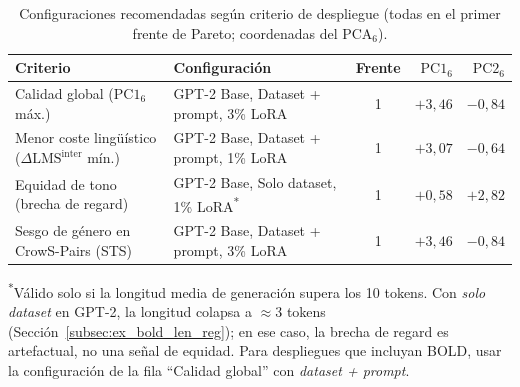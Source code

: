 \documentclass[12pt,a4paper]{report}
\newcommand{\dLMSp}{\ensuremath{\Delta\mathrm{LMS}}}
\newcommand{\PCAsix}{\ensuremath{\mathrm{PCA}_6}}
\newcommand{\PConeSix}{\ensuremath{\mathrm{PC1}_6}}
\newcommand{\PCtwoSix}{\ensuremath{\mathrm{PC2}_6}}
\begin{document}
\begin{table}[H]
\centering\footnotesize
\setlength{\tabcolsep}{4pt}
\caption{Configuraciones recomendadas según criterio de despliegue (todas en el primer frente de Pareto; coordenadas del \PCAsix{}).}
\label{tab:ex_decision_recomendacion}
\begin{tabularx}{\linewidth}{@{} L Y c r r @{}}
\toprule
\textbf{Criterio} & \textbf{Configuración} & \textbf{Frente} & \textbf{\PConeSix{}} & \textbf{\PCtwoSix{}} \\
\midrule
Calidad global (\PConeSix{} máx.) & GPT-2 Base, Dataset + prompt, 3\% LoRA & 1 & $+3{,}46$ & $-0{,}84$ \\
Menor coste lingüístico ($\dLMSp^{\mathrm{inter}}$ mín.) & GPT-2 Base, Dataset + prompt, 1\% LoRA & 1 & $+3{,}07$ & $-0{,}64$ \\
Equidad de tono (brecha de regard) & GPT-2 Base, Solo dataset, 1\% LoRA\textsuperscript{*} & 1 & $+0{,}58$ & $+2{,}82$ \\
Sesgo de género en CrowS-Pairs (STS) & GPT-2 Base, Dataset + prompt, 3\% LoRA & 1 & $+3{,}46$ & $-0{,}84$ \\
\bottomrule
\end{tabularx}
\par\smallskip\footnotesize \textsuperscript{*}Válido solo si la longitud media de generación supera los 10 tokens. Con \textit{solo dataset} en GPT-2, la longitud colapsa a $\approx$3 tokens (Sección~\ref{subsec:ex_bold_len_reg}); en ese caso, la brecha de regard es artefactual, no una señal de equidad. Para despliegues que incluyan BOLD, usar la configuración de la fila ``Calidad global'' con \textit{dataset + prompt}.
\end{table}
\end{document}
